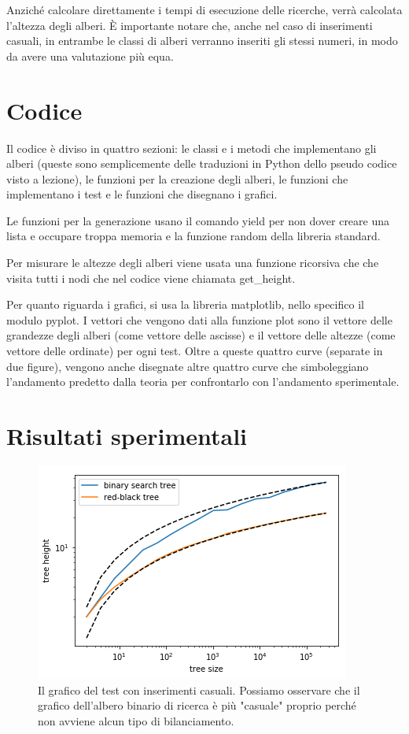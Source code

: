 \documentclass{article}
\begin{document}
Anziché calcolare direttamente i tempi di esecuzione delle ricerche, verrà calcolata l'altezza degli alberi. È importante notare che, anche nel caso di inserimenti casuali, in entrambe le classi di alberi verranno inseriti gli stessi numeri, in modo da avere una valutazione più equa.

\section{Codice}

Il codice è diviso in quattro sezioni: le classi e i metodi che implementano gli alberi (queste sono semplicemente delle traduzioni in Python dello pseudo codice visto a lezione), le funzioni per la creazione degli alberi, le funzioni che implementano i test e le funzioni che disegnano i grafici.

Le funzioni per la generazione usano il comando yield per non dover creare una lista e occupare troppa memoria e la funzione random della libreria standard.

Per misurare le altezze degli alberi viene usata una funzione ricorsiva che che visita tutti i nodi che nel codice viene chiamata get\_height.

Per quanto riguarda i grafici, si usa la libreria matplotlib, nello specifico il modulo pyplot. I vettori che vengono dati alla funzione plot sono il vettore delle grandezze degli alberi (come vettore delle ascisse) e il vettore delle altezze (come vettore delle ordinate) per ogni test. Oltre a queste quattro curve (separate in due figure), vengono anche disegnate altre quattro curve che simboleggiano l'andamento predetto dalla teoria per confrontarlo con l'andamento sperimentale.

\section{Risultati sperimentali}

\begin{figure}[ht]
    \centering
    \includegraphics{random}
    \caption{Il grafico del test con inserimenti casuali. Possiamo osservare che il grafico dell'albero binario di ricerca è più "casuale" proprio perché non avviene alcun tipo di bilanciamento.}
    \label{fig:random}
\end{figure}
\end{document}
